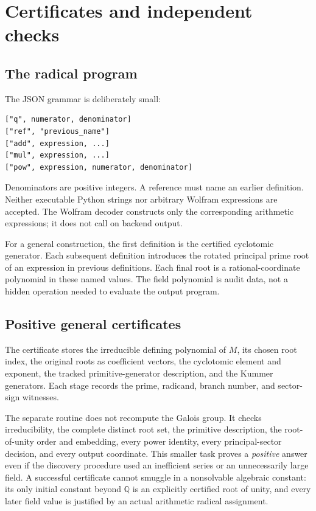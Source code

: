 \documentclass[11pt,letterpaper]{article}
\theoremstyle{definition}\newtheorem{definition}[theorem]{Definition}
\theoremstyle{remark}\newtheorem{remark}[theorem]{Remark}
\newcommand{\Q}{\mathbb Q}\newcommand{\C}{\mathbb C}\newcommand{\Z}{\mathbb Z}
\newcommand{\code}[1]{\texttt{\detokenize{#1}}}
\begin{document}
\section{Certificates and independent checks}\label{sec:certificates}
\subsection{The radical program}
The JSON grammar is deliberately small:
\begin{lstlisting}
["q", numerator, denominator]
["ref", "previous_name"]
["add", expression, ...]
["mul", expression, ...]
["pow", expression, numerator, denominator]
\end{lstlisting}
Denominators are positive integers. A reference must name an earlier definition. Neither executable Python strings nor arbitrary Wolfram expressions are accepted. The Wolfram decoder constructs only the corresponding arithmetic expressions; it does not call \code{ToExpression} on backend output.

For a general construction, the first definition is the certified cyclotomic generator. Each subsequent definition introduces the rotated principal prime root of an expression in previous definitions. Each final root is a rational-coordinate polynomial in these named values. The field polynomial is audit data, not a hidden operation needed to evaluate the output program.

\subsection{Positive general certificates}
The certificate stores the irreducible defining polynomial of $M$, its chosen root index, the original roots as coefficient vectors, the cyclotomic element and exponent, the tracked primitive-generator description, and the Kummer generators. Each stage records the prime, radicand, branch number, and sector-sign witnesses.

The separate \code{verify_constructive} routine does not recompute the Galois group. It checks irreducibility, the complete distinct root set, the primitive description, the root-of-unity order and embedding, every power identity, every principal-sector decision, and every output coordinate. This smaller task proves a \emph{positive} answer even if the discovery procedure used an inefficient series or an unnecessarily large field. A successful certificate cannot smuggle in a nonsolvable algebraic constant: its only initial constant beyond $\Q$ is an explicitly certified root of unity, and every later field value is justified by an actual arithmetic radical assignment.
\end{document}
